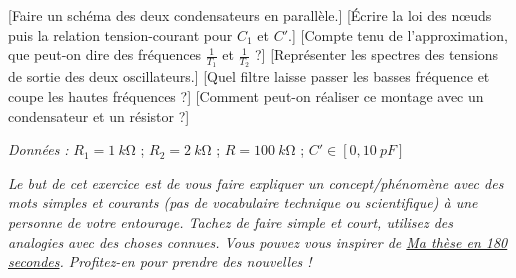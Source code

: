   \begin{enumerate}
      [Faire un schéma des deux condensateurs en parallèle.]
      [Écrire la loi des nœuds puis la relation tension-courant pour $C_1$ et $C'$.]
      [Compte tenu de l’approximation, que peut-on dire des fréquences $\frac{1}{T_1}$ et $\frac{1}{T_2}$ ?]
      [Représenter les spectres des tensions de sortie des deux oscillateurs.]
      [Quel filtre laisse passer les basses fréquence et coupe les hautes fréquences ?]
      [Comment peut-on réaliser ce montage avec un condensateur et un résistor ?]
  \end{enumerate}

  \textit{Données : } $R_1=\SI{1}{k\ohm}$ ; $R_2=\SI{2}{k\ohm}$ ; $R=\SI{100}{k\ohm}$ ; $C'\in [0,\SI{10}{pF}]$

  \textit{Le but de cet exercice est de vous faire expliquer un concept/phénomène avec des mots simples et courants (pas de vocabulaire technique ou scientifique) à une personne de votre entourage. Tachez de faire simple et court, utilisez des analogies avec des choses connues. Vous pouvez vous inspirer de \href{https://www.youtube.com/@MT180_fr}{Ma thèse en 180 secondes}. Profitez-en pour prendre des nouvelles !}

  \begin{enumerate}
  \end{enumerate}

